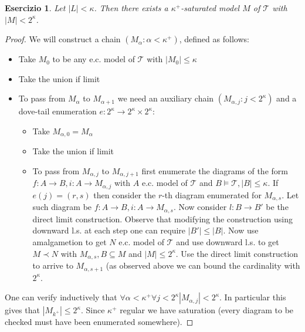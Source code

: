 \documentclass{article}
\newtheorem{exercise}{Esercizio}
\begin{document}
\begin{exercise}

	Let $|L| < \kappa$. Then there exists a $\kappa^+$-saturated model $M$ of $\mathcal{T}$ with $|M| < 2^{\kappa}$.

\end{exercise}

\begin{proof}

	We will construct a chain $(M_\alpha : \alpha < \kappa^+)$, defined as follows:
	\begin{itemize}
		\item	Take $M_0$ to be any e.c. model of $\mathcal{T}$ with $|M_0| \leq \kappa$
		\item	Take the union if limit
		\item	To pass from $M_\alpha$ to $M_{\alpha +1}$ we need an auxiliary chain $(M_{\alpha,j}: j < 2^\kappa)$
			and a dove-tail enumeration $e: 2^\kappa \to 2^\kappa \times 2^\kappa$:
			\begin{itemize}
				\item	Take $M_{\alpha,0} = M_\alpha$
				\item	Take the union if limit
				\item	To pass from $M_{\alpha,j}$ to $M_{\alpha,j+1}$ first enumerate the diagrams of the form $f: A \to B, i:A \to M_{\alpha,j}$
					with $A$ e.c. model of $\mathcal{T}$ and $B \models \mathcal{T},|B| \leq \kappa$.
					If $e(j) = (r,s)$ then consider the $r$-th diagram enumerated for $M_{\alpha,s}$.
					Let such diagram be $f:A \to B,i:A \to M_{\alpha,s}$. Now consider $l: B \to B'$ be the direct limit construction.
					Observe that modifying the construction using downward l.s. at each step one can require $|B'| \leq |B|$.
					Now use amalgametion to get $N$ e.c. model of $\mathcal{T}$ and use downward l.s. to get $M \prec N$ with 
					$M_{\alpha,s},B \subseteq M$ and $|M| \leq 2^\kappa$.
					Use the direct limit construction to arrive to $M_{\alpha,s+1}$ (as observed above we can bound the cardinality with $2^\kappa$.
			\end{itemize}
	\end{itemize}

	One can verify inductively that $\forall \alpha < \kappa^+ \forall j<2^\kappa |M_{\alpha,j}| < 2^{\kappa}$.
	In particular this gives that $|M_{k^+}| \leq 2^\kappa$.
	Since $\kappa^+$ regular we have saturation (every diagram to be checked must have been enumerated somewhere).

\end{proof}
\end{document}
